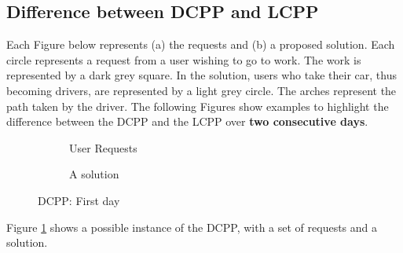 \documentclass[12pt, a4paper, twoside]{memoir}
\begin{document}
{	\subsection*{Difference between DCPP and LCPP}
	Each Figure below represents (a) the requests and (b) a proposed solution. Each circle represents a request from a user wishing to go to work. The work is represented by a dark grey square. \newline
	In the solution, users who take their car, thus becoming drivers, are represented by a light grey circle. The arches represent the path taken by the driver.\newline 
	The following Figures show examples to highlight the difference between the DCPP and the LCPP over \textbf{two consecutive days}.
	
	\begin{figure}[H]
		\centering
		\begin{subfigure}{.5\textwidth}
			\centering
			\caption{User Requests}
		\end{subfigure}%
		\begin{subfigure}{.5\textwidth}
			\centering
			\caption{A solution}
		\end{subfigure}
		\caption{DCPP: First day}
		\label{fig:DCPP D1}
	\end{figure}
	
	Figure \ref{fig:DCPP D1} shows a possible instance of the DCPP, with a set of requests and a solution.

}
\end{document}

